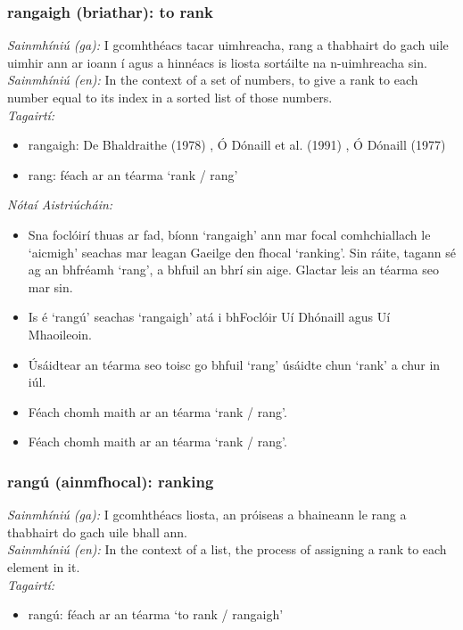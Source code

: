 \documentclass{article}
\begin{document}
\subsubsection*{rangaigh (briathar): to rank}
 \noindent \textit{Sainmhíniú (ga):} I gcomhthéacs tacar uimhreacha, rang a thabhairt do gach uile uimhir ann ar ioann í agus a hinnéacs is liosta sortáilte na n-uimhreacha sin.
\\
 \noindent \textit{Sainmhíniú (en):} In the context of a set of numbers, to give a rank to each number equal to its index in a sorted list of those numbers.
\\
 \noindent \textit{Tagairtí:}
\begin{itemize}
	\item rangaigh: De Bhaldraithe (1978) \cite{de-bhaldraithe}, Ó Dónaill et al. (1991) \cite{focloir-beag}, Ó Dónaill (1977) \cite{odonaill}
	\item rang: féach ar an téarma `rank / rang'
\end{itemize}

 \noindent \textit{Nótaí Aistriúcháin:}
\begin{itemize}
	\item Sna foclóirí thuas ar fad, bíonn `rangaigh' ann mar focal comhchiallach le `aicmigh' seachas mar leagan Gaeilge den fhocal `ranking'. Sin ráite, tagann sé ag an bhfréamh `rang', a bhfuil an bhrí sin aige. Glactar leis an téarma seo mar sin.
	\item Is é `rangú' seachas `rangaigh' atá i bhFoclóir Uí Dhónaill agus Uí Mhaoileoin.
	\item Úsáidtear an téarma seo toisc go bhfuil `rang' úsáidte chun `rank' a chur in iúl.
	\item Féach chomh maith ar an téarma `rank / rang'.
	\item Féach chomh maith ar an téarma `rank / rang'.
\end{itemize}


\subsubsection*{rangú (ainmfhocal): ranking}
 \noindent \textit{Sainmhíniú (ga):} I gcomhthéacs liosta, an próiseas a bhaineann le rang a thabhairt do gach uile bhall ann.
\\
 \noindent \textit{Sainmhíniú (en):} In the context of a list, the process of assigning a rank to each element in it.
\\
 \noindent \textit{Tagairtí:}
\begin{itemize}
	\item rangú: féach ar an téarma `to rank / rangaigh'
\end{itemize}
\end{document}
